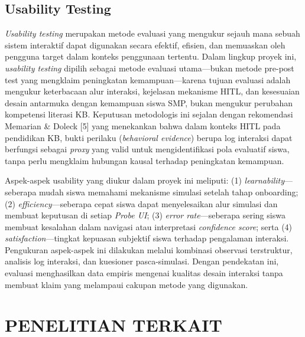 \subsection{Usability Testing}
\label{subsec:usability-testing}

\textit{Usability testing} merupakan metode evaluasi yang mengukur sejauh mana sebuah sistem interaktif dapat digunakan secara efektif, efisien, dan memuaskan oleh pengguna target dalam konteks penggunaan tertentu. Dalam lingkup proyek ini, \textit{usability testing} dipilih sebagai metode evaluasi utama---bukan metode pre-post test yang mengklaim peningkatan kemampuan---karena tujuan evaluasi adalah mengukur keterbacaan alur interaksi, kejelasan mekanisme HITL, dan kesesuaian desain antarmuka dengan kemampuan siswa SMP, bukan mengukur perubahan kompetensi literasi KB. Keputusan metodologis ini sejalan dengan rekomendasi Memarian \& Doleck [5] yang menekankan bahwa dalam konteks HITL pada pendidikan KB, bukti perilaku (\textit{behavioral evidence}) berupa log interaksi dapat berfungsi sebagai \textit{proxy} yang valid untuk mengidentifikasi pola evaluatif siswa, tanpa perlu mengklaim hubungan kausal terhadap peningkatan kemampuan.

Aspek-aspek usability yang diukur dalam proyek ini meliputi: (1) \textit{learnability}---seberapa mudah siswa memahami mekanisme simulasi setelah tahap onboarding; (2) \textit{efficiency}---seberapa cepat siswa dapat menyelesaikan alur simulasi dan membuat keputusan di setiap \textit{Probe UI}; (3) \textit{error rate}---seberapa sering siswa membuat kesalahan dalam navigasi atau interpretasi \textit{confidence score}; serta (4) \textit{satisfaction}---tingkat kepuasan subjektif siswa terhadap pengalaman interaksi. Pengukuran aspek-aspek ini dilakukan melalui kombinasi observasi terstruktur, analisis log interaksi, dan kuesioner pasca-simulasi. Dengan pendekatan ini, evaluasi menghasilkan data empiris mengenai kualitas desain interaksi tanpa membuat klaim yang melampaui cakupan metode yang digunakan.

\section{PENELITIAN TERKAIT}
\label{sec:penelitian-terkait}

